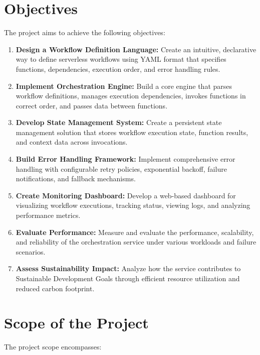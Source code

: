 \documentclass{fisatprojectfinal}
\begin{document}
\section{Objectives}
The project aims to achieve the following objectives:

\begin{enumerate}
    \item \textbf{Design a Workflow Definition Language:} Create an intuitive, declarative way to define serverless workflows using YAML format that specifies functions, dependencies, execution order, and error handling rules.
    
    \item \textbf{Implement Orchestration Engine:} Build a core engine that parses workflow definitions, manages execution dependencies, invokes functions in correct order, and passes data between functions.
    
    \item \textbf{Develop State Management System:} Create a persistent state management solution that stores workflow execution state, function results, and context data across invocations.
    
    \item \textbf{Build Error Handling Framework:} Implement comprehensive error handling with configurable retry policies, exponential backoff, failure notifications, and fallback mechanisms.
    
    \item \textbf{Create Monitoring Dashboard:} Develop a web-based dashboard for visualizing workflow executions, tracking status, viewing logs, and analyzing performance metrics.
    
    \item \textbf{Evaluate Performance:} Measure and evaluate the performance, scalability, and reliability of the orchestration service under various workloads and failure scenarios.
    
    \item \textbf{Assess Sustainability Impact:} Analyze how the service contributes to Sustainable Development Goals through efficient resource utilization and reduced carbon footprint.
\end{enumerate}

\section{Scope of the Project}
The project scope encompasses:
\end{document}
